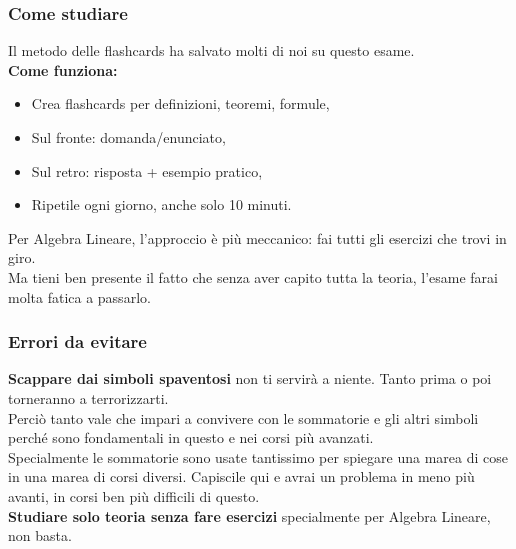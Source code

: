 \documentclass[18pt]{extarticle}
\begin{document}
\subsubsection{Come studiare}
Il metodo delle flashcards ha salvato molti di noi su questo esame.\\
\textbf{Come funziona:}
\begin{itemize}
\item Crea flashcards per definizioni, teoremi, formule,
\item Sul fronte: domanda/enunciato,
\item Sul retro: risposta + esempio pratico,
\item Ripetile ogni giorno, anche solo 10 minuti.
\end{itemize}
Per Algebra Lineare, l'approccio è più meccanico: fai tutti gli esercizi che trovi in giro.\\
Ma tieni ben presente il fatto che senza aver capito tutta la teoria, l'esame farai molta fatica a passarlo.



\subsubsection{Errori da evitare}
\textbf{Scappare dai simboli spaventosi} non ti servirà a niente. Tanto prima o poi torneranno a terrorizzarti.\\
Perciò tanto vale che impari a convivere con le sommatorie e gli altri simboli perché sono fondamentali in questo e nei corsi più avanzati.\\
Specialmente le sommatorie sono usate tantissimo per spiegare una marea di cose in una marea di corsi diversi. Capiscile qui e avrai un problema in meno più avanti, in corsi ben più difficili di questo.\\
\textbf{Studiare solo teoria senza fare esercizi} specialmente per Algebra Lineare, non basta.
\end{document}
